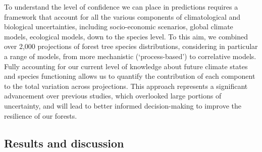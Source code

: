 \documentclass[11pt,letter]{article}
\begin{document}
To understand the level of confidence we can place in predictions requires a framework that account for all the various components of climatological and biological uncertainties, including socio-economic scenarios, global climate models, ecological models, down to the species level. To this aim, we combined over 2,000 projections of forest tree species distributions, considering in particular a range of models, from more mechanistic (‘process-based’) to correlative models. Fully accounting for our current level of knowledge about future climate states and species functioning allows us to quantify the contribution of each component to the total variation across projections. This approach represents a significant advancement over previous studies, which overlooked large portions of uncertainty, and will lead to better informed decision-making to improve the resilience of our forests.


\subsection*{Results and discussion}
\end{document}
